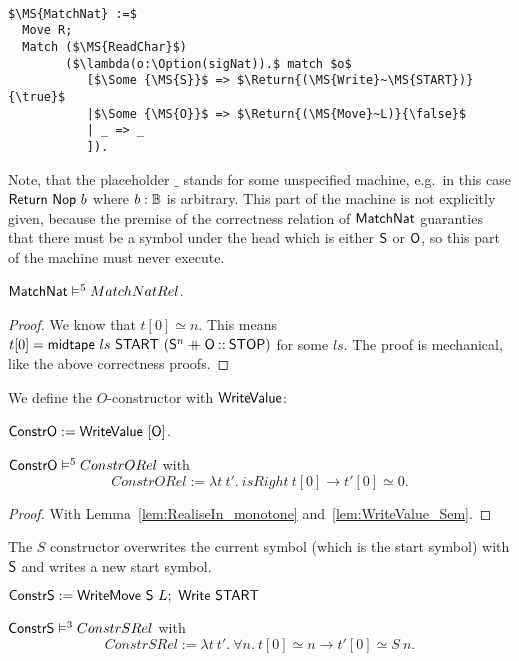 \begin{definition}[$\MS{MatchNat}$]
  \label{def:MatchNat}
  ~
\begin{lstlisting}[style=semicoqstyle]
$\MS{MatchNat} :=$
  Move R; 
  Match ($\MS{ReadChar}$) 
        ($\lambda(o:\Option(sigNat)).$ match $o$
           [$\Some {\MS{S}}$ => $\Return{(\MS{Write}~\MS{START})}{\true}$
           |$\Some {\MS{O}}$ => $\Return{(\MS{Move}~L)}{\false}$
           | _ => _ 
           ]).
\end{lstlisting}
\end{definition}

Note, that the placeholder $\_$ stands for some unspecified machine, e.g.\ in this case $\mathsf{Return}~\mathsf{Nop}~b$ where $b:\mathbb{B}$ is arbitrary.  This part of
the machine is not explicitly given, because the premise of the correctness relation of $\MS{MatchNat}$ guaranties that there must be a symbol under
the head which is either $\mathsf{S}$ or $\mathsf{O}$, so this part of the machine must never execute.

\begin{lemma}
  $\mathsf{MatchNat} \mathrel{\vDash^{5}} MatchNatRel$.
\end{lemma}
\begin{proof}
  We know that $t[0] \simeq n$.  This means $t[0] = \mathsf{midtape}~ls~\mathsf{START}~(\mathsf{S}^n \mathbin{+\mkern-10mu+} \mathsf{O} \mathbin{::} \mathsf{STOP})$ for some $ls$.  The proof is
  mechanical, like the above correctness proofs.
\end{proof}

We define the $O$-constructor with $\mathsf{WriteValue}$:
\begin{definition}[$\MS{ConstrO}$]
  \label{def:Constr_O}
  $\mathsf{ConstrO} := \mathsf{WriteValue}~[\mathsf{O}]$.
\end{definition}
\begin{lemma}
  \label{lem:Constr_O_Sem}
  $\mathsf{ConstrO} \mathrel{\vDash^{5}} ConstrORel$ with
  \[
    ConstrORel := \lambda t~t'.~isRight~t[0] \rightarrow t'[0] \simeq 0.
  \]
\end{lemma}
\begin{proof}
  With Lemma~\ref{lem:RealiseIn_monotone} and~\ref{lem:WriteValue_Sem}.
\end{proof}

The $S$ constructor overwrites the current symbol (which is the start symbol) with $\mathsf{S}$ and writes a new start symbol.
\begin{definition}[$\MS{ConstrS}$]
  $\mathsf{ConstrS} := \mathsf{WriteMove}~\mathsf{S}~L ;~ \mathsf{Write}~\mathsf{START}$
\end{definition}
\begin{lemma}
  $\mathsf{ConstrS} \mathrel{\vDash^{3}} ConstrSRel$ with
  \[
    ConstrSRel := \lambda t~t'.~\forall n.~ t[0] \simeq n \rightarrow t'[0] \simeq S~n.
  \]
\end{lemma}


